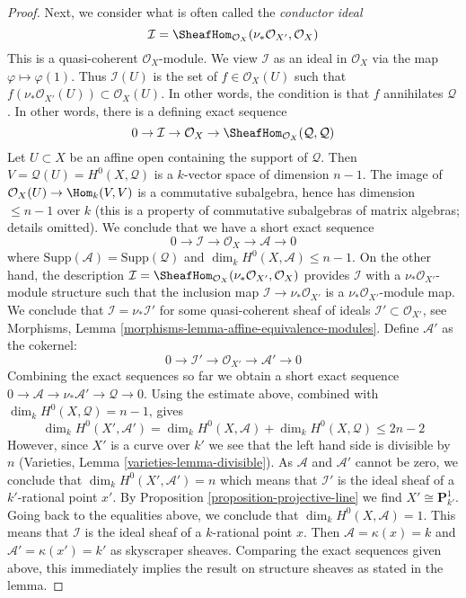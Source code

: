 \begin{proof}
\medskip\noindent
Next, we consider what is often called the {\it conductor ideal}
$$
\mathcal{I} = \SheafHom_{\mathcal{O}_X}(\nu_*\mathcal{O}_{X'}, \mathcal{O}_X)
$$
This is a quasi-coherent $\mathcal{O}_X$-module. We view $\mathcal{I}$
as an ideal in $\mathcal{O}_X$ via the map $\varphi \mapsto \varphi(1)$.
Thus $\mathcal{I}(U)$ is the set of $f \in \mathcal{O}_X(U)$ such that
$f \left(\nu_*\mathcal{O}_{X'}(U)\right) \subset \mathcal{O}_X(U)$. In
other words, the condition is that $f$ annihilates $\mathcal{Q}$.
In other words, there is a defining exact sequence
$$
0 \to \mathcal{I} \to \mathcal{O}_X \to
\SheafHom_{\mathcal{O}_X}(\mathcal{Q}, \mathcal{Q})
$$
Let $U \subset X$ be an affine open containing the support of $\mathcal{Q}$.
Then $V = \mathcal{Q}(U) = H^0(X, \mathcal{Q})$ is a $k$-vector space
of dimension $n - 1$. The image of
$\mathcal{O}_X(U) \to \Hom_k(V, V)$ is a commutative subalgebra,
hence has dimension $\leq n - 1$ over $k$ (this is a property of
commutative subalgebras of matrix algebras; details omitted).
We conclude that we have a short exact sequence
$$
0 \to \mathcal{I} \to \mathcal{O}_X \to \mathcal{A} \to 0
$$
where $\text{Supp}(\mathcal{A}) = \text{Supp}(\mathcal{Q})$
and $\dim_k H^0(X, \mathcal{A}) \leq n - 1$.
On the other hand, the description
$\mathcal{I} = \SheafHom_{\mathcal{O}_X}(\nu_*\mathcal{O}_{X'}, \mathcal{O}_X)$
provides $\mathcal{I}$ with a $\nu_*\mathcal{O}_{X'}$-module structure
such that the inclusion map $\mathcal{I} \to \nu_*\mathcal{O}_{X'}$
is a $\nu_*\mathcal{O}_{X'}$-module map.
We conclude that $\mathcal{I} = \nu_*\mathcal{I}'$
for some quasi-coherent sheaf of ideals
$\mathcal{I}' \subset \mathcal{O}_{X'}$, see
Morphisms, Lemma \ref{morphisms-lemma-affine-equivalence-modules}.
Define $\mathcal{A}'$ as the cokernel:
$$
0 \to \mathcal{I}' \to \mathcal{O}_{X'} \to \mathcal{A}' \to 0
$$
Combining the exact sequences so far we obtain a short exact sequence
$0 \to \mathcal{A} \to \nu_*\mathcal{A}' \to \mathcal{Q} \to 0$.
Using the estimate above,
combined with $\dim_k H^0(X, \mathcal{Q}) = n - 1$, gives
$$
\dim_k H^0(X', \mathcal{A}') =
\dim_k H^0(X, \mathcal{A}) + \dim_k H^0(X, \mathcal{Q}) \leq 2 n - 2
$$
However, since $X'$ is a curve over $k'$ we see that
the left hand side is divisible by $n$
(Varieties, Lemma \ref{varieties-lemma-divisible}).
As $\mathcal{A}$ and $\mathcal{A}'$ cannot be zero, we conclude that
$\dim_k H^0(X', \mathcal{A}') = n$ which means that $\mathcal{I}'$
is the ideal sheaf of a $k'$-rational point $x'$.
By Proposition \ref{proposition-projective-line}
we find $X' \cong \mathbf{P}^1_{k'}$.
Going back to the equalities above, we conclude that
$\dim_k H^0(X, \mathcal{A}) = 1$. This
means that $\mathcal{I}$ is the ideal sheaf of a
$k$-rational point $x$. Then $\mathcal{A} = \kappa(x) = k$
and $\mathcal{A}' = \kappa(x') = k'$ as skyscraper sheaves.
Comparing the exact sequences given above,
this immediately implies the result on structure sheaves
as stated in the lemma.
\end{proof}

